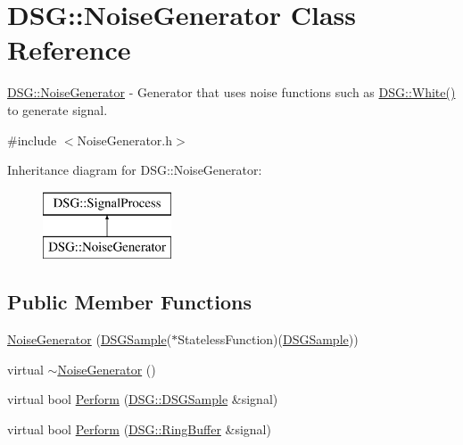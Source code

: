 \hypertarget{class_d_s_g_1_1_noise_generator}{\section{D\+S\+G\+:\+:Noise\+Generator Class Reference}
\label{class_d_s_g_1_1_noise_generator}
}


\hyperlink{class_d_s_g_1_1_noise_generator}{D\+S\+G\+::\+Noise\+Generator} -\/ Generator that uses noise functions such as \hyperlink{namespace_d_s_g_1_1_noise_a0d1c4b4522d2e56b1aa604e45ab92066}{D\+S\+G\+::\+White()} to generate signal.  




{\ttfamily \#include $<$Noise\+Generator.\+h$>$}

Inheritance diagram for D\+S\+G\+:\+:Noise\+Generator\+:\begin{figure}[H]
\begin{center}
\leavevmode
\includegraphics[height=2.000000cm]{class_d_s_g_1_1_noise_generator}
\end{center}
\end{figure}
\subsection*{Public Member Functions}
\begin{DoxyCompactItemize}
\item 
\hyperlink{class_d_s_g_1_1_noise_generator_ac78b8347da0c0593d495d9d054821c34}{Noise\+Generator} (\hyperlink{namespace_d_s_g_ac39a94cd27ebcd9c1e7502d0c624894a}{D\+S\+G\+Sample}($\ast$Stateless\+Function)(\hyperlink{namespace_d_s_g_ac39a94cd27ebcd9c1e7502d0c624894a}{D\+S\+G\+Sample}))
\item 
virtual \hyperlink{class_d_s_g_1_1_noise_generator_a964f0af791b5e09e63470bf42ddbce79}{$\sim$\+Noise\+Generator} ()
\item 
virtual bool \hyperlink{class_d_s_g_1_1_noise_generator_aa4f8426176cb0d461cbead361288f204}{Perform} (\hyperlink{namespace_d_s_g_ac39a94cd27ebcd9c1e7502d0c624894a}{D\+S\+G\+::\+D\+S\+G\+Sample} \&signal)
\item 
virtual bool \hyperlink{class_d_s_g_1_1_noise_generator_aee0a20c0a436c02f122a0f78664e99ec}{Perform} (\hyperlink{class_d_s_g_1_1_ring_buffer}{D\+S\+G\+::\+Ring\+Buffer} \&signal)
\end{DoxyCompactItemize}
